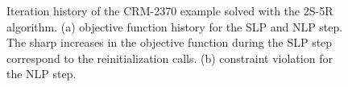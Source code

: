 \begin{figure}
    \centering
    \bigskip
    \caption{Iteration history of the CRM-2370 example solved with the 2S-5R algorithm. (a) objective function history for the SLP and NLP step. The sharp increases in the objective function during the SLP step correspond to the reinitialization calls. (b) constraint violation for the NLP step.}
    \label{fig:07_c3}
\end{figure}


